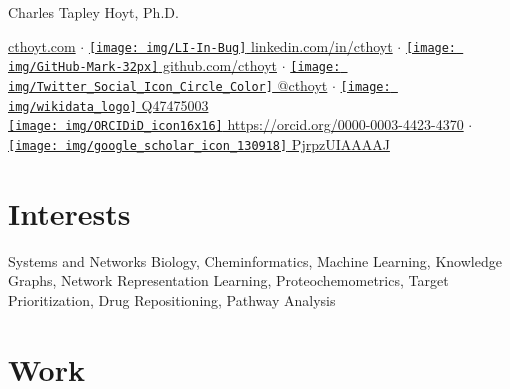 \documentclass[11pt,a4paper,sans]{moderncv} %
\begin{document}
{\Huge Charles Tapley Hoyt, Ph.D.}

\vspace{3mm}

\href{https://cthoyt.com}{cthoyt.com}
$\cdot$
\href{https://linkedin.com/in/cthoyt}{\texttt{[image: img/LI-In-Bug]} linkedin.com/in/cthoyt}
$\cdot$
\href{https://github.com/cthoyt}{\texttt{[image: img/GitHub-Mark-32px]} github.com/cthoyt}
$\cdot$
\href{https://twitter.com/cthoyt}{\texttt{[image: img/Twitter\_Social\_Icon\_Circle\_Color]} @cthoyt}
$\cdot$
\href{https://www.wikidata.org/wiki/Q47475003}{\texttt{[image: img/wikidata\_logo]} Q47475003}
\\
\href{https://orcid.org/0000-0003-4423-4370}{\texttt{[image: img/ORCIDiD\_icon16x16]} https://orcid.org/0000-0003-4423-4370}
$\cdot$
\href{https://scholar.google.com/citations?user=PjrpzUIAAAAJ&hl=en}{\texttt{[image: img/google\_scholar\_icon\_130918]} PjrpzUIAAAAJ}

\section{Interests}\label{sec:interests}

Systems and Networks Biology, Cheminformatics, Machine Learning, Knowledge Graphs, Network Representation Learning, Proteochemometrics, Target Prioritization, Drug Repositioning, Pathway Analysis


\section{Work}\label{sec:work}







\end{document}
